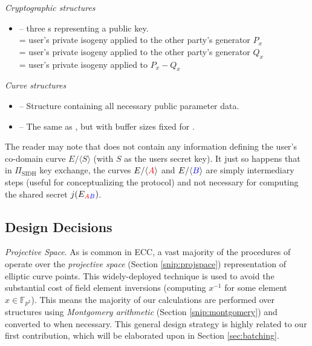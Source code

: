 \emph{Cryptographic structures}
\begin{itemize}
	\item {} -- three s representing a public key.\\
	 = user's private isogeny applied to the other party's generator $P_x$\\
	 = user's private isogeny applied to the other party's generator $Q_x$\\
	 = user's private isogeny applied to $P_x - Q_x$
\end{itemize}

\emph{Curve structures}
\begin{itemize}
	\item {} -- Structure containing all necessary public parameter data.
	\item {} -- The same as , but with buffer sizes fixed for .
\end{itemize}

The reader may note that  does not contain any information defining the user's co-domain curve $E/\langle S \rangle$ (with $S$ as the users secret key). It just so happens that in $\Pi_{\text{SIDH}}$ key exchange, the curves $E/\langle \textcolor{red}{A} \rangle$ and $E/\langle \textcolor{blue}{B} \rangle$ are simply intermediary steps (useful for conceptualizing the protocol) and not necessary for computing the shared secret $j(E_{\textcolor{red}{A}\textcolor{blue}{B}})$.

\subsection{Design Decisions}

\noindent
\emph{Projective Space}. As is common in ECC, a vast majority of the procedures of \sidh operate over the \emph{projective space} (Section \ref{snip:projspace}) representation of elliptic curve points. This widely-deployed technique is used to avoid the substantial cost of field element inversions (computing $x^{-1}$ for some element $x \in \mathbb{F}_{p^2}$). This means the majority of our calculations are performed over  structures using \emph{Montgomery arithmetic} (Section \ref{snip:montgomery}) and converted to  when necessary. This general design strategy is highly related to our first contribution, which will be elaborated upon in Section \ref{sec:batching}.\\

